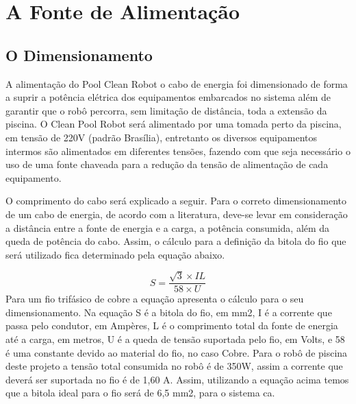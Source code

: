 \section{A Fonte de Alimentação}
\subsection{O Dimensionamento}
A alimentação do Pool Clean Robot o cabo de energia foi dimensionado de forma a suprir a potência elétrica dos equipamentos embarcados no sistema além de garantir que o robô percorra, sem limitação de distância, toda a extensão da piscina. O Clean Pool Robot será alimentado por uma tomada perto da piscina, em tensão de 220V (padrão Brasília), entretanto os diversos equipamentos intermos são alimentados em diferentes tensões, fazendo com que seja necessário o uso de uma fonte chaveada para a redução da tensão de alimentação de cada equipamento.

O comprimento do cabo será explicado a seguir. Para o correto dimensionamento de um cabo de energia, de acordo com a literatura, deve-se levar em consideração a distância entre a fonte de energia e a carga, a potência consumida, além da queda de potência do cabo. Assim, o cálculo para a definição da bitola do fio que será utilizado fica determinado pela equação abaixo.

\begin{displaymath}
  S = \frac{\sqrt{3} \times IL}{58 \times U}
\end{displaymath}
Para um fio trifásico de cobre a equação apresenta o cálculo para o seu dimensionamento. Na equação S é a bitola do fio, em mm2, I é a corrente que passa pelo condutor, em Ampères, L é o comprimento total da fonte de energia até a carga, em metros, U é a queda de tensão suportada pelo fio, em Volts, e 58 é uma constante devido ao material do fio, no caso Cobre. Para o robô de piscina deste projeto a tensão total consumida no robô é de 350W, assim a corrente que deverá ser suportada no fio é de 1,60 A. Assim, utilizando a equação acima temos que a bitola ideal para o fio será de 6,5 mm2, para o sistema ca.

